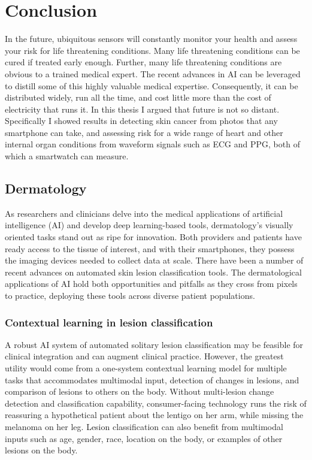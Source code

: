\chapter{Conclusion}
In the future, ubiquitous sensors will constantly monitor your health and assess your risk for life threatening conditions.  Many life threatening conditions can be cured if treated early enough.  Further, many life threatening conditions are obvious to a trained medical expert.  The recent advances in AI can be leveraged to distill some of this highly valuable medical expertise.  Consequently, it can be distributed widely, run all the time, and cost little more than the cost of electricity that runs it.  In this thesis I argued that future is not so distant.  Specifically I showed results in detecting skin cancer from photos that any smartphone can take, and assessing risk for a wide range of heart and other internal organ conditions from waveform signals such as ECG and PPG, both of which a smartwatch can measure.

\section{Dermatology}
As researchers and clinicians delve into the medical applications of artificial intelligence (AI) and develop deep learning-based tools, dermatology's visually oriented tasks stand out as ripe for innovation. Both providers and patients have ready access to the tissue of interest, and with their smartphones, they possess the imaging devices needed to collect data at scale. There have been a number of recent advances on automated skin lesion classification tools. The dermatological applications of AI hold both opportunities and pitfalls as they cross from pixels to practice, deploying these tools across diverse patient populations.

\subsection{Contextual learning in lesion classification}
A robust AI system of automated solitary lesion classification may be feasible for clinical integration and can augment clinical practice. However, the greatest utility would come from a one-system contextual learning model for multiple tasks that accommodates multimodal input, detection of changes in lesions, and comparison of lesions to others on the body. Without multi-lesion change detection and classification capability, consumer-facing technology runs the risk of reassuring a hypothetical patient about the lentigo on her arm, while missing the melanoma on her leg. Lesion classification can also benefit from multimodal inputs such as age, gender, race, location on the body, or examples of other lesions on the body.

